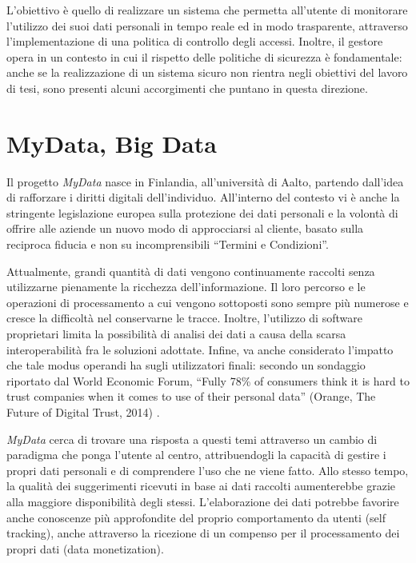 L’obiettivo \`e quello di realizzare un sistema che permetta all’utente di monitorare l’utilizzo dei suoi dati personali in tempo reale ed in modo trasparente, attraverso l’implementazione di una politica di controllo degli accessi. Inoltre, il gestore opera in un contesto in cui il rispetto delle politiche di sicurezza \`e fondamentale: anche se la realizzazione di un sistema sicuro non rientra negli obiettivi del lavoro di tesi, sono presenti alcuni accorgimenti che puntano in questa direzione.

\section{MyData, Big Data}
Il progetto \textit{MyData} nasce in Finlandia, all’universit\`a di Aalto, partendo dall’idea di rafforzare i diritti digitali dell’individuo. All’interno del contesto vi \`e anche la stringente legislazione europea sulla protezione dei dati personali e la volont\`a di offrire alle aziende un nuovo modo di approcciarsi al cliente, basato sulla reciproca fiducia e non su incomprensibili “Termini e Condizioni”.

Attualmente, grandi quantit\`a di dati vengono continuamente raccolti senza utilizzarne pienamente la ricchezza dell’informazione. Il loro percorso e le operazioni di processamento a cui vengono sottoposti sono sempre pi\`u numerose e cresce la difficolt\`a nel conservarne le tracce. Inoltre, l’utilizzo di software proprietari limita la possibilit\`a di analisi dei dati a causa della scarsa interoperabilit\`a fra le soluzioni adottate. Infine, va anche considerato l’impatto che tale modus operandi ha sugli utilizzatori finali: secondo un sondaggio riportato dal World Economic Forum, “Fully 78\% of consumers think it is hard to trust companies when it comes to use of their personal data” (Orange, The Future of Digital Trust, 2014) \cite{wefreport}.

\textit{MyData} cerca di trovare una risposta a questi temi attraverso un cambio di paradigma che ponga l’utente al centro, attribuendogli la capacit\`a di gestire i propri dati personali e di comprendere l’uso che ne viene fatto. Allo stesso tempo, la qualit\`a dei suggerimenti ricevuti in base ai dati raccolti aumenterebbe grazie alla maggiore disponibilit\`a degli stessi. L’elaborazione dei dati potrebbe favorire anche conoscenze pi\`u approfondite del proprio comportamento da utenti (self tracking), anche attraverso la ricezione di un compenso per il processamento dei propri dati (data monetization)\cite{mydatawhitepaper}.

